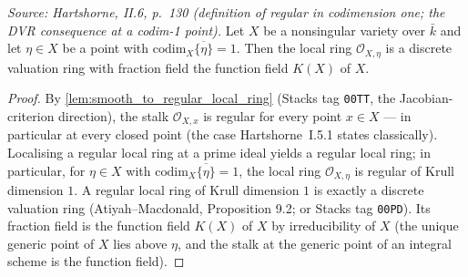 \begin{lemma}\leanok
  \label{lem:smooth_codim_one_dvr}
  \textit{Source: Hartshorne, II.6, p.~130 (definition of regular in codimension one;
  the DVR consequence at a codim-1 point).}
  Let \(X\) be a nonsingular variety over \(\bar k\) and let \(\eta \in X\) be a point with
  \(\mathrm{codim}_X \overline{\{\eta\}} = 1\). Then the local ring \(\mathcal O_{X, \eta}\) is a
  discrete valuation ring with fraction field the function field \(K(X)\) of \(X\).
\end{lemma}

\begin{proof}

  By \cref{lem:smooth_to_regular_local_ring} (Stacks tag \texttt{00TT}, the
  Jacobian-criterion direction), the stalk \(\mathcal O_{X, x}\) is regular for
  every point \(x \in X\) --- in particular at every closed point (the case
  Hartshorne~I.5.1 states classically). Localising a regular local ring at a
  prime ideal yields a regular local ring; in particular, for \(\eta \in X\) with
  \(\mathrm{codim}_X \overline{\{\eta\}} = 1\), the local ring
  \(\mathcal O_{X, \eta}\) is regular of Krull dimension \(1\). A regular local ring of Krull dimension \(1\) is exactly a
  discrete valuation ring (Atiyah--Macdonald, Proposition 9.2; or Stacks tag
  \texttt{00PD}). Its fraction field is the function field \(K(X)\) of \(X\) by
  irreducibility of \(X\) (the unique generic point of \(X\) lies above \(\eta\), and the
  stalk at the generic point of an integral scheme is the function field).
\end{proof}


